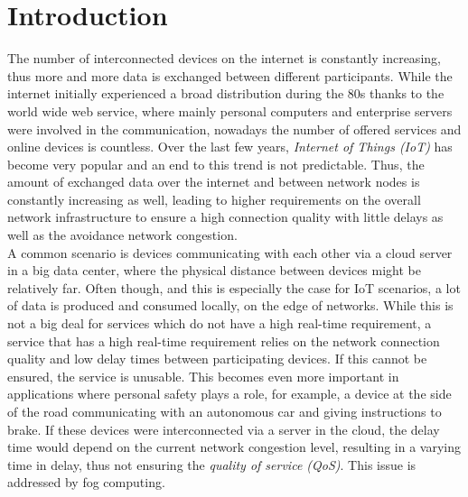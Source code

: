 \chapter{Introduction\label{cha:chapter1}}

The number of interconnected devices on the internet is constantly increasing, thus more and more data is exchanged between different participants.
While the internet initially experienced a broad distribution during the 80s thanks to the world wide web service, where mainly personal computers and enterprise servers were involved in the communication, nowadays the number of offered services and online devices is countless.
Over the last few years, \textit{Internet of Things (IoT)} has become very popular and an end to this trend is not predictable.
Thus, the amount of exchanged data over the internet and between network nodes is constantly increasing as well, leading to higher requirements on the overall network infrastructure to ensure a high connection quality with little delays as well as the avoidance network congestion.\\

A common scenario is devices communicating with each other via a cloud server in a big data center, where the physical distance between devices might be relatively far.
Often though, and this is especially the case for IoT scenarios, a lot of data is produced and consumed locally, on the edge of networks.
While this is not a big deal for services which do not have a high real-time requirement, a service that has a high real-time requirement relies on the network connection quality and low delay times between participating devices.
If this cannot be ensured, the service is unusable.
This becomes even more important in applications where personal safety plays a role, for example, a device at the side of the road communicating with an autonomous car and giving instructions to brake.
If these devices were interconnected via a server in the cloud, the delay time would depend on the current network congestion level, resulting in a varying time in delay, thus not ensuring the \textit{quality of service (QoS)}.
This issue is addressed by fog computing.\\

